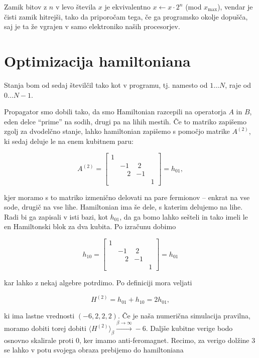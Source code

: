 \documentclass[a4 paper, 12pt]{article}
\begin{document}
Zamik bitov z $n$ v levo števila $x$ je ekvivalentno $x \leftarrow x\cdot2^n$ (mod $x_\text{max}$), vendar je čisti
zamik hitrejši, tako da priporočam tega, če ga programsko okolje dopušča, saj
je ta že vgrajen v samo elektroniko naših procesorjev.

\section{Optimizacija hamiltoniana}

Stanja bom od sedaj številčil tako kot v programu, tj. namesto od $1\ldots N$,
raje od $0 \ldots N-1$.

Propagator smo dobili tako, da smo Hamiltonian razcepili na operatorja $A$ in $B$, eden delce "`prime"' na sodih,
drugi pa na lihih mestih. Če to matriko zapišemo zgolj za dvodelčno stanje, lahko hamiltonian zapišemo s pomočjo
matrike $A^{(2)}$, ki sedaj deluje le na enem kubitnem paru:

\[
	A^{(2)} = \begin{bmatrix}
		1 &  &  &  \\
		&-1 &\ 2 &  \\
		 & \quad 2 & -1 &  \\
		 &  &  & 1
		\end{bmatrix} = h_{01},
\]

kjer moramo s to matriko izmenično delovati na pare fermionov -- enkrat na vse sode, drugič na vse lihe. Hamiltonian
ima še dele, s katerim delujemo na lihe. Radi bi ga zapisali v isti bazi, kot $h_{01}$, da ga bomo lahko sešteli
in tako imeli le en Hamiltonski blok za dva kubita. Po izračunu dobimo

\[
	h_{10} =  \begin{bmatrix}
		1 &  &  &  \\
		&-1 &\ 2 &  \\
		 & \quad 2 & -1 &  \\
		 &  &  & 1
		\end{bmatrix} = h_{01}
\]

kar lahko z nekaj algebre potrdimo. Po definiciji mora veljati

\begin{equation}
	H^{(2)} = h_{01} + h_{10} = 2h_{01},
\end{equation}

ki ima lastne vrednosti $(-6, 2, 2, 2)$.
Če je naša numerična simulacija pravilna, moramo dobiti torej dobiti $\langle H^{(2)} \rangle_\beta
\stackrel{\beta \to \infty}{\longrightarrow} -6$. Daljše kubitne verige bodo osnovno skalirale proti 0, ker imamo
anti-feromagnet. Recimo, za verigo dolžine $3$ se lahko v potu svojega obraza prebijemo do hamiltoniana
\end{document}
